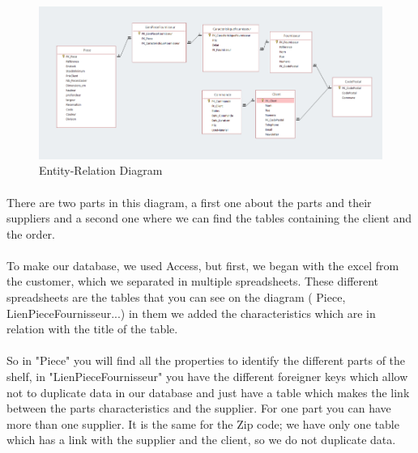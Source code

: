 \documentclass[12pt,oneside]{report}
\begin{document}
        \begin{figure}[h!]
            \centering
			\includegraphics[width = 1\textwidth]{Figures/EntityRelation.png}
			\caption{Entity-Relation Diagram}
			\label{entityrelation}
		\end{figure} 
		
        \paragraph{}
        There are two parts in this diagram, a first one about the parts and their suppliers and a second one where we can find the tables containing the client and the order.
        
        \paragraph{}
        To make our database, we used Access, but first, we began with the excel from the customer, which we separated in multiple spreadsheets. These different spreadsheets are the tables that you can see on the diagram ( Piece, LienPieceFournisseur...) in them we added the characteristics which are in relation with the title of the table.  
        
        \paragraph{}
        So in "Piece" you will find all the properties to identify the different parts of the shelf, in "LienPieceFournisseur" you have the different foreigner keys which allow not to duplicate data in our database and just have a table which makes the link between the parts characteristics and the supplier. For one part you can have more than one supplier. It is the same for the Zip code; we have only one table which has a link with the supplier and the client, so we do not duplicate data. 
        
\end{document}
